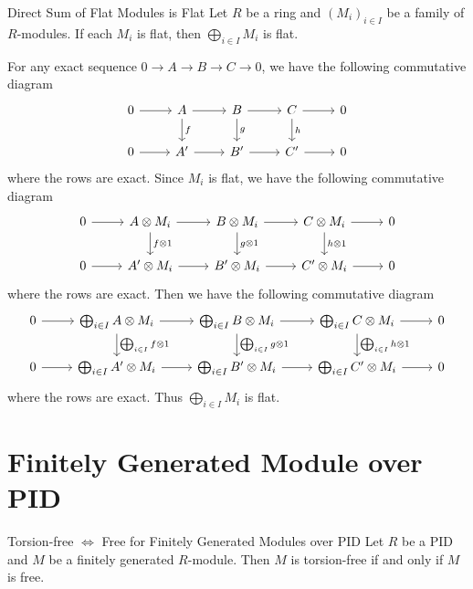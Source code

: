 \begin{proposition}{Direct Sum of Flat Modules is Flat}{}
    Let $R$ be a ring and $\left(M_i\right)_{i\in I}$ be a family of $R$-modules. If each $M_i$ is flat, then $\bigoplus_{i\in I}M_i$ is flat.
\end{proposition}
\begin{prf}
    For any exact sequence $0\to A\to B\to C\to 0$, we have the following commutative diagram
    \[
        \begin{tikzcd}
            0 \arrow[r] & A \arrow[r] \arrow[d, "f"] & B \arrow[r] \arrow[d, "g"] & C \arrow[r] \arrow[d, "h"] & 0 \\
            0 \arrow[r] & A' \arrow[r] & B' \arrow[r] & C' \arrow[r] & 0
        \end{tikzcd}
    \]
    where the rows are exact. Since $M_i$ is flat, we have the following commutative diagram
    \[
        \begin{tikzcd}
            0 \arrow[r] & A\otimes M_i \arrow[r] \arrow[d, "f\otimes 1"] & B\otimes M_i \arrow[r] \arrow[d, "g\otimes 1"] & C\otimes M_i \arrow[r] \arrow[d, "h\otimes 1"] & 0 \\
            0 \arrow[r] & A'\otimes M_i \arrow[r] & B'\otimes M_i \arrow[r] & C'\otimes M_i \arrow[r] & 0
        \end{tikzcd}
    \]
    where the rows are exact. Then we have the following commutative diagram
    \[
        \begin{tikzcd}
            0 \arrow[r] & \bigoplus_{i\in I}A\otimes M_i \arrow[r] \arrow[d, "\bigoplus_{i\in I}f\otimes 1"] & \bigoplus_{i\in I}B\otimes M_i \arrow[r] \arrow[d, "\bigoplus_{i\in I}g\otimes 1"] & \bigoplus_{i\in I}C\otimes M_i \arrow[r] \arrow[d, "\bigoplus_{i\in I}h\otimes 1"] & 0 \\
            0 \arrow[r] & \bigoplus_{i\in I}A'\otimes M_i \arrow[r] & \bigoplus_{i\in I}B'\otimes M_i \arrow[r] & \bigoplus_{i\in I}C'\otimes M_i \arrow[r] & 0
        \end{tikzcd}
    \]
    where the rows are exact. Thus $\bigoplus_{i\in I}M_i$ is flat.
    
\end{prf}

\section{Finitely Generated Module over PID}

\begin{proposition}{Torsion-free $\iff$ Free for Finitely Generated Modules over PID}{}
    Let $R$ be a PID and $M$ be a finitely generated $R$-module. Then $M$ is torsion-free if and only if $M$ is free.
\end{proposition}


